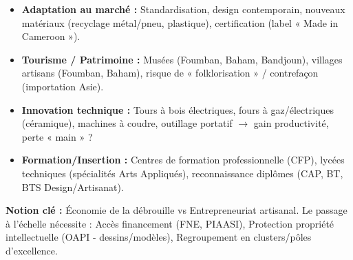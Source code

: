 \documentclass[11pt]{article}
\newcommand{\cle}[1]{{\popxbold\color{popdark}#1}}
\begin{document}
\begin{methode}
\begin{enumerate}
\begin{itemize}
            \item \textbf{Adaptation au marché :} Standardisation, design contemporain, nouveaux matériaux (recyclage métal/pneu, plastique), certification (label « Made in Cameroon »).
            \item \textbf{Tourisme / Patrimoine :} Musées (Foumban, Baham, Bandjoun), villages artisans (Foumban, Baham), risque de « folklorisation » / contrefaçon (importation Asie).
            \item \textbf{Innovation technique :} Tours à bois électriques, fours à gaz/électriques (céramique), machines à coudre, outillage portatif $\rightarrow$ gain productivité, perte « main » ?
            \item \textbf{Formation/Insertion :} Centres de formation professionnelle (CFP), lycées techniques (spécialités Arts Appliqués), reconnaissance diplômes (CAP, BT, BTS Design/Artisanat).
        \end{itemize}
\end{enumerate}
\textbf{Notion clé :} \cle{Économie de la débrouille} vs \cle{Entrepreneuriat artisanal}. Le passage à l'échelle nécessite : Accès financement (FNE, PIAASI), Protection propriété intellectuelle (OAPI - dessins/modèles), Regroupement en clusters/pôles d'excellence.
\end{methode}
\end{document}
